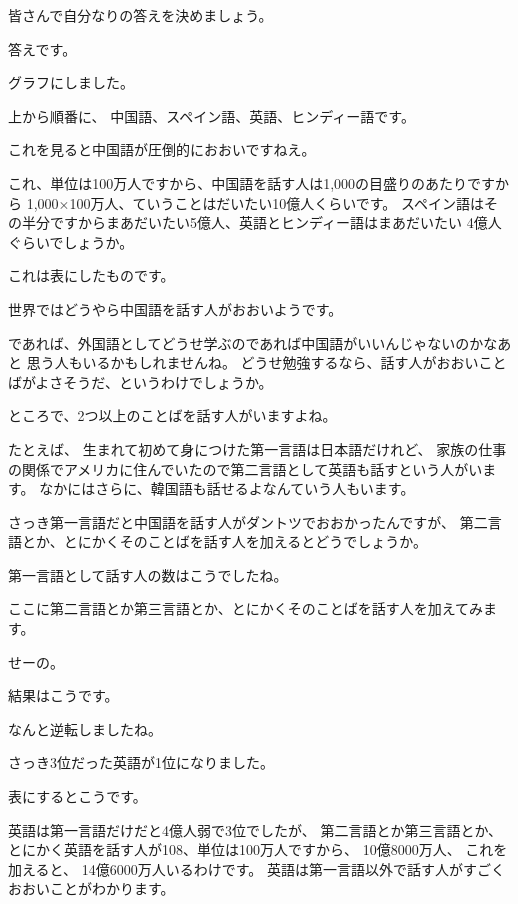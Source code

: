 \documentclass[12pt]{jlreq}
\begin{document}
皆さんで自分なりの答えを決めましょう。

\hrulefill


答えです。

グラフにしました。

上から順番に、
中国語、スペイン語、英語、ヒンディー語です。

これを見ると中国語が圧倒的におおいですねえ。

これ、単位は100万人ですから、中国語を話す人は1,000の目盛りのあたりですから
1,000$\times$100万人、ていうことはだいたい10億人くらいです。
スペイン語はその半分ですからまあだいたい5億人、英語とヒンディー語はまあだいたい
4億人ぐらいでしょうか。

\hrulefill

これは表にしたものです。

世界ではどうやら中国語を話す人がおおいようです。

であれば、外国語としてどうせ学ぶのであれば中国語がいいんじゃないのかなあと
思う人もいるかもしれませんね。
どうせ勉強するなら、話す人がおおいことばがよさそうだ、というわけでしょうか。


\hrulefill

ところで、2つ以上のことばを話す人がいますよね。

たとえば、
生まれて初めて身につけた第一言語は日本語だけれど、
家族の仕事の関係でアメリカに住んでいたので第二言語として英語も話すという人がいます。
なかにはさらに、韓国語も話せるよなんていう人もいます。

\hrulefill

さっき第一言語だと中国語を話す人がダントツでおおかったんですが、
第二言語とか、とにかくそのことばを話す人を加えるとどうでしょうか。

\hrulefill

第一言語として話す人の数はこうでしたね。

ここに第二言語とか第三言語とか、とにかくそのことばを話す人を加えてみます。

せーの。


\hrulefill

結果はこうです。

なんと逆転しましたね。

さっき3位だった英語が1位になりました。

\hrulefill

表にするとこうです。

英語は第一言語だけだと4億人弱で3位でしたが、
第二言語とか第三言語とか、とにかく英語を話す人が108、単位は100万人ですから、
10億8000万人、
これを加えると、
14億6000万人いるわけです。
英語は第一言語以外で話す人がすごくおおいことがわかります。
\end{document}
